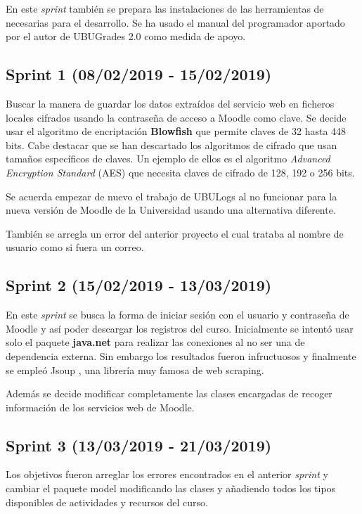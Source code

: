 En este \textit{sprint} también se prepara las instalaciones de las herramientas de necesarias para el desarrollo. Se ha usado el manual del programador aportado por el autor de  UBUGrades 2.0 como medida de apoyo.


\subsection{Sprint 1 (08/02/2019 - 15/02/2019)}

Buscar la manera de guardar los datos extraídos del servicio web en ficheros locales cifrados usando la contraseña de acceso a Moodle como clave. Se decide usar el algoritmo de encriptación \textbf{Blowfish} \cite{noauthor_schneier_nodate} que permite claves de 32 hasta 448 bits. Cabe destacar que se han descartado los algoritmos de cifrado que usan tamaños específicos de claves. Un ejemplo de ellos es el algoritmo \textit{Advanced Encryption Standard} (AES) \cite{rouse_what_2017} que necesita claves de cifrado de 128, 192 o 256 bits.

Se acuerda empezar de nuevo el trabajo de UBULogs al no funcionar para la nueva versión de Moodle de la Universidad usando una alternativa diferente.

También se arregla un error del anterior proyecto el cual trataba al nombre de usuario como si fuera un correo.

\subsection{Sprint 2 (15/02/2019 - 13/03/2019)}

En este \textit{sprint} se busca la forma de iniciar sesión con el usuario y contraseña de Moodle y así poder descargar los registros del curso. Inicialmente se intentó usar solo el paquete \textbf{java.net} \cite{noauthor_java.net_nodate} para realizar las conexiones al no ser una de dependencia externa. Sin embargo los resultados fueron infructuosos y finalmente se empleó Jsoup \cite{noauthor_jsoup_nodate}, una librería muy famosa de web scraping.

Además se decide modificar completamente las clases encargadas de recoger información de los servicios web de Moodle.

\subsection{Sprint 3 (13/03/2019 - 21/03/2019)}

Los objetivos fueron arreglar los errores encontrados en el anterior \textit{sprint} y cambiar el paquete model modificando las clases y añadiendo todos los tipos disponibles de actividades y recursos del curso.

